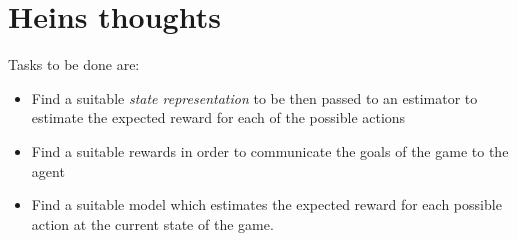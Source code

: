\documentclass[12pt]{report}
\begin{document}

\tableofcontents
\pagebreak

\renewcommand{\thesection}{\arabic{section}}
\section{Heins thoughts}
Tasks to be done are:
	\begin{itemize}
		\item Find a suitable \textit{state representation} to be then passed to an estimator to estimate the expected reward for each of the possible actions
		\item Find a suitable rewards in order to communicate the goals of the game to the agent
		\item Find a suitable model which estimates the expected reward for each possible action at the current state of the game.
	\end{itemize}
\end{document}
